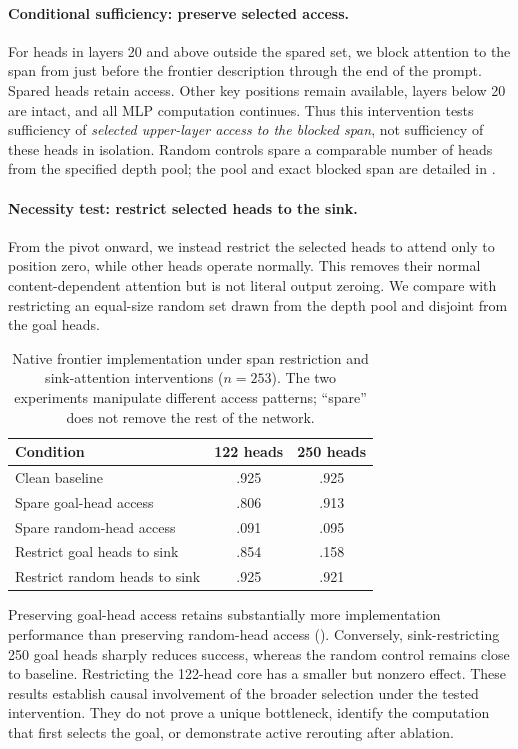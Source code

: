 \paragraph{Conditional sufficiency: preserve selected access.}
For heads in layers 20 and above outside the spared set, we block attention to the span from just before the frontier description through the end of the prompt. Spared heads retain access. Other key positions remain available, layers below 20 are intact, and all MLP computation continues. Thus this intervention tests sufficiency of \emph{selected upper-layer access to the blocked span}, not sufficiency of these heads in isolation. Random controls spare a comparable number of heads from the specified depth pool; the pool and exact blocked span are detailed in .

\paragraph{Necessity test: restrict selected heads to the sink.}
From the pivot onward, we instead restrict the selected heads to attend only to position zero, while other heads operate normally. This removes their normal content-dependent attention but is not literal output zeroing. We compare with restricting an equal-size random set drawn from the depth pool and disjoint from the goal heads.

\begin{table}[t]
\centering\small
\begin{tabular}{lcc}
\toprule
Condition & 122 heads & 250 heads\\
\midrule
Clean baseline & .925 & .925\\
Spare goal-head access & .806 & .913\\
Spare random-head access & .091 & .095\\
\midrule
Restrict goal heads to sink & .854 & .158\\
Restrict random heads to sink & .925 & .921\\
\bottomrule
\end{tabular}
\caption{Native frontier implementation under span restriction and sink-attention interventions ($n=253$). The two experiments manipulate different access patterns; ``spare'' does not remove the rest of the network.}
\label{tab:goal-ablation}
\end{table}

Preserving goal-head access retains substantially more implementation performance than preserving random-head access (). Conversely, sink-restricting 250 goal heads sharply reduces success, whereas the random control remains close to baseline. Restricting the 122-head core has a smaller but nonzero effect. These results establish causal involvement of the broader selection under the tested intervention. They do not prove a unique bottleneck, identify the computation that first selects the goal, or demonstrate active rerouting after ablation.

